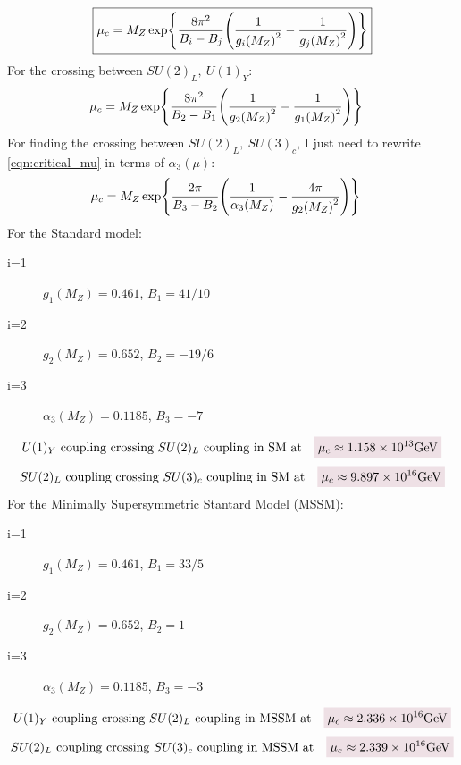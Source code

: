 \documentclass[12 pt,draft]{article}
\begin{document}
\begin{problem}
		\begin{align}
			\boxed{\mu_c=M_Z\exp{\oo[8\pi^2]{B_i-B_j}\qty(\oo{{g_i(M_Z)}^2}-\oo{{g_j(M_Z)}^2})}}\label{eqn:critical_mu}
		\end{align}
		For the crossing between $SU(2)_L,\ U(1)_Y$:
		\begin{align}
			\mu_c&=M_Z\exp{\oo[8\pi^2]{B_2-B_1}\qty(\oo{{g_2(M_Z)}^2}-\oo{{g_1(M_Z)}^2})}
		\end{align}
		For finding the crossing between  $SU(2)_L,\ SU(3)_c$, I just need to rewrite \ref{eqn:critical_mu} in terms of $\alpha_3(\mu)$:
		\begin{align}
			\mu_c&=M_Z\exp{\oo[2\pi]{B_3-B_2}\qty(\oo{\alpha_3(M_Z)}-\oo[4\pi]{{g_2(M_Z)}^2})}
		\end{align}
		\newpage
		For the Standard model:
		\begin{description}
			\item[i=1] $g_1(M_Z)=0.461$, $B_1=41/10$
			\item[i=2] $g_2(M_Z)=0.652$, $B_2=-19/6$
			\item[i=3] $\alpha_3(M_Z)=0.1185$, $B_3=-7$
		\end{description}
		\begin{align}
			U(1)_Y \text{ coupling crossing }  SU(2)_L
			\text{ coupling in SM at}
			\quad
			\coloredanswer{\mu_{c}\approx 1.158\times10^{13}\text{GeV}}
		\end{align}
		\begin{align}
			SU(2)_L \text{ coupling crossing }  SU(3)_c
			\text{ coupling in SM at}
			\quad
			\coloredanswer{\mu_{c}\approx 9.897\times10^{16}\text{GeV}}
		\end{align}
		For the Minimally Supersymmetric Stantard Model (MSSM):
		\begin{description}
			\item[i=1] $g_1(M_Z)=0.461$, $B_1=33/5$
			\item[i=2] $g_2(M_Z)=0.652$, $B_2=1$
			\item[i=3] $\alpha_3(M_Z)=0.1185$, $B_3=-3$
		\end{description}
		\begin{align}
			U(1)_Y\text{ coupling crossing } SU(2)_L 
			\text{ coupling in MSSM at}
			\quad
			\coloredanswer{\mu_{c}\approx2.336\times10^{16}\text{GeV}}
		\end{align}
		\begin{align}
			SU(2)_L \text{ coupling crossing }  SU(3)_c
			\text{ coupling in MSSM at}
			\quad
			\coloredanswer{\mu_{c}\approx 2.339\times10^{16}\text{GeV}}
		\end{align}
	\end{problem}
\end{document}
